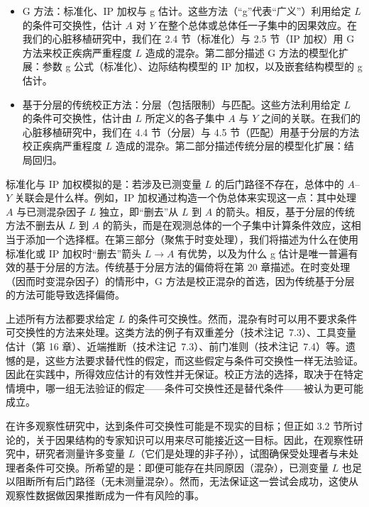 \begin{itemize}
\item G 方法：标准化、IP 加权与 g 估计。这些方法（“g”代表“广义”）利用给定 $L$ 的条件可交换性，估计 $A$ 对 $Y$ 在整个总体或总体任一子集中的因果效应。在我们的心脏移植研究中，我们在 2.4 节（标准化）与 2.5 节（IP 加权）用 G 方法来校正疾病严重程度 $L$ 造成的混杂。第二部分描述 G 方法的模型化扩展：参数 g 公式（标准化）、边际结构模型的 IP 加权，以及嵌套结构模型的 g 估计。
\item 基于分层的传统校正方法：分层（包括限制）与匹配。这些方法利用给定 $L$ 的条件可交换性，估计由 $L$ 所定义的各子集中 $A$ 与 $Y$ 之间的关联。在我们的心脏移植研究中，我们在 4.4 节（分层）与 4.5 节（匹配）用基于分层的方法校正疾病严重程度 $L$ 造成的混杂。第二部分描述传统分层的模型化扩展：结局回归。
\end{itemize}

标准化与 IP 加权模拟的是：若涉及已测变量 $L$ 的后门路径不存在，总体中的 $A$–$Y$ 关联会是什么样。例如，IP 加权通过构造一个伪总体来实现这一点：其中处理 $A$ 与已测混杂因子 $L$ 独立，即“删去”从 $L$ 到 $A$ 的箭头。相反，基于分层的传统方法不删去从 $L$ 到 $A$ 的箭头，而是在观测总体的一个子集中计算条件效应，这相当于添加一个选择框。在第三部分（聚焦于时变处理），我们将描述为什么在使用标准化或 IP 加权时“删去”箭头 $L\to A$ 有优势，以及为什么 g 估计是唯一普遍有效的基于分层的方法。传统基于分层方法的偏倚将在第 20 章描述。在时变处理（因而时变混杂因子）的情形中，G 方法是校正混杂的首选，因为传统基于分层的方法可能导致选择偏倚。

上述所有方法都要求给定 $L$ 的条件可交换性。然而，混杂有时可以用不要求条件可交换性的方法来处理。这类方法的例子有双重差分（技术注记~7.3）、工具变量估计（第 16 章）、近端推断（技术注记~7.3）、前门准则（技术注记~7.4）等。遗憾的是，这些方法要求替代性的假定，而这些假定与条件可交换性一样无法验证。因此在实践中，所得效应估计的有效性并无保证。校正方法的选择，取决于在特定情境中，哪一组无法验证的假定——条件可交换性还是替代条件——被认为更可能成立。

在许多观察性研究中，达到条件可交换性可能是不现实的目标；但正如 3.2 节所讨论的，关于因果结构的专家知识可以用来尽可能接近这一目标。因此，在观察性研究中，研究者测量许多变量 $L$（它们是处理的非子孙），试图确保受处理者与未处理者条件可交换。所希望的是：即便可能存在共同原因（混杂），已测变量 $L$ 也足以阻断所有后门路径（无未测量混杂）。然而，无法保证这一尝试会成功，这使从观察性数据做因果推断成为一件有风险的事。

